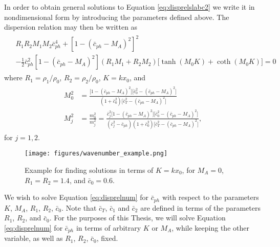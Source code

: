 \documentclass[12pt]{ociamthesis}
\begin{document}
In order to obtain general solutions to Equation \eqref{eq:disprelslabc2} we write it in nondimensional form by introducing the parameters defined above.
The dispersion relation may then be written as
%
\begin{align}
\label{eq:disprelnum}
\begin{split}
& R_1 R_2 M_1 M_2 \bar c_{ph}^4
+ \left[ 1 - ( \bar c_{ph} - M_A )^2 \right]^2
\\[0.3cm]
& - \frac{1}{2} \bar c_{ph}^2 \left[ 1 - ( \bar c_{ph} - M_A )^2 \right]
\left( R_1 M_1 + R_2 M_2 \right)
\big[ \tanh ( M_0 K ) + \coth ( M_0 K ) \big] = 0
\end{split}
\end{align}
%
where $R_1 = \rho_1/\rho_0$, $R_2 = \rho_2/\rho_0$, $K = k x_0$, and
%
\begin{align}
\label{eq:Mj}
\begin{split}
M_0^2
& = \frac{\big[1 - ( \bar c_{ph} - M_A )^2 \big] \big[\bar c_0^2 - ( \bar c_{ph} - M_A )^2 \big] }
{ (1 + \bar c_0^2) \big[\bar c_T^2 - ( \bar c_{ph} - M_A )^2 \big] }
\\[0.3cm]
M_j^2 & = \frac{m_0^2}{m_j^2}
= \frac{\bar c_j^2 \big[1 - ( \bar c_{ph} - M_A )^2 \big] \big[\bar c_0^2 - ( \bar c_{ph} - M_A )^2 \big] }
{(\bar c_j^2 - \bar c_{ph} ) (1 + \bar c_0^2) \big[\bar c_T^2 - ( \bar c_{ph} - M_A )^2 \big] },
\end{split}
\end{align}
%
for $j = 1, 2$.

%
\begin{figure}[ht]
\centering
 \texttt{[image: figures/wavenumber\_example.png]}
 \caption{Example for finding solutions in terms of $K = k x_0$, for $M_A=0$, $R_1=R_2=1.4$, and $\bar c_0 = 0.6$.}
 \label{fig:num_example}
\end{figure}
%

We wish to solve Equation \eqref{eq:disprelnum} for $\bar c_{ph}$ with respect to the parameters $K$, $M_A$, $R_1$, $R_2$, $\bar c_0$.
Note that $\bar c_T$, $\bar c_1$ and $\bar c_2$ are defined in terms of the parameters $R_1$, $R_2$, and $\bar c_0$.
For the purposes of this Thesis, we will solve Equation \eqref{eq:disprelnum} for $\bar c_{ph}$ in terms of arbitrary $K$ or $M_A$, while keeping the other variable, as well as $R_1$, $R_2$, $\bar c_0$, fixed.
\end{document}
